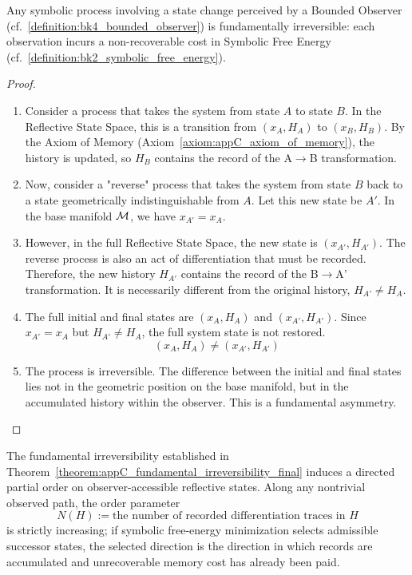 \begin{theorem}
\label{theorem:appC_fundamental_irreversibility_final}
Any symbolic process involving a state change perceived by a Bounded Observer (cf.~\ref{definition:bk4_bounded_observer}) is fundamentally irreversible: each observation incurs a non-recoverable cost in Symbolic Free Energy (cf.~\ref{definition:bk2_symbolic_free_energy}).
\end{theorem}

\begin{proof}
\label{proof:appC_fundamental_irreversibility}
\leavevmode

\begin{enumerate}
    \item Consider a process that takes the system from state \(A\) to state \(B\). In the Reflective State Space, this is a transition from \((x_A, H_A)\) to \((x_B, H_B)\). By the Axiom of Memory (Axiom~\ref{axiom:appC_axiom_of_memory}), the history is updated, so \(H_B\) contains the record of the A\(\to\)B transformation.

    \item Now, consider a "reverse" process that takes the system from state \(B\) back to a state geometrically indistinguishable from \(A\). Let this new state be \(A'\). In the base manifold \(\mathcal{M}\), we have \(x_{A'} = x_A\).

    \item However, in the full Reflective State Space, the new state is \((x_{A'}, H_{A'})\). The reverse process is also an act of differentiation that must be recorded. Therefore, the new history \(H_{A'}\) contains the record of the B\(\to\)A' transformation. It is necessarily different from the original history, \(H_{A'} \neq H_A\).

    \item The full initial and final states are \((x_A, H_A)\) and \((x_{A'}, H_{A'})\). Since \(x_{A'} = x_A\) but \(H_{A'} \neq H_A\), the full system state is not restored.
    \[
    (x_A, H_A) \neq (x_{A'}, H_{A'})
    \]
    \item The process is irreversible. The difference between the initial and final states lies not in the geometric position on the base manifold, but in the accumulated history within the observer. This is a fundamental asymmetry.
\end{enumerate}
\end{proof}

\begin{corollary}
\label{corollary:appC_emergence_of_time_arrow_final}
The fundamental irreversibility established in
Theorem~\ref{theorem:appC_fundamental_irreversibility_final} induces a directed
partial order on observer-accessible reflective states. Along any nontrivial
observed path, the order parameter
\[
N(H):=\text{the number of recorded differentiation traces in }H
\]
is strictly increasing; if symbolic free-energy minimization selects admissible
successor states, the selected direction is the direction in which records are
accumulated and unrecoverable memory cost has already been paid.
\end{corollary}

